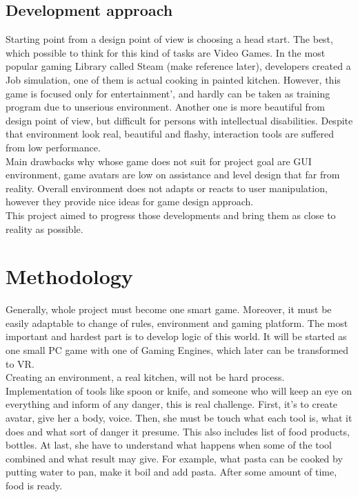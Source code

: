 \documentclass[18pt]{article}
\numberwithin{equation}{section} %
\numberwithin{figure}{section} %
\numberwithin{table}{section} %
\begin{document}
	\subsection{Development approach}
		Starting point from a design point of view is choosing a head start. The best, which possible to think for this kind of tasks are Video Games. In the most popular gaming Library called Steam (make reference later), developers created a Job simulation, one of them is actual cooking in painted kitchen. However, this game is focused only for entertainment', and hardly can be taken as training program due to unserious environment. Another one is more beautiful from design point of view, but difficult for persons with intellectual disabilities. Despite that environment look real, beautiful and flashy, interaction tools are suffered from low performance. \\
		Main drawbacks why whose game does not suit for project goal are GUI environment, game avatars are low on assistance and level design that far from reality. Overall environment does not adapts or reacts to user manipulation, however they provide nice ideas for game design approach. \\
		This project aimed to progress those developments and bring them as close to reality as possible. \\
	
\section{Methodology}	
	Generally, whole project must become one smart game. Moreover, it must be easily adaptable to change of rules, environment and gaming platform. The most important and hardest part is to develop logic of this world. It will be started as one small PC game with one of Gaming Engines, which later can be transformed to VR. \\
	
	Creating an environment, a real kitchen, will not be hard process. Implementation of tools like spoon or knife, and someone who will keep an eye on everything and inform of any danger, this is real challenge. First, it's to create avatar, give her a body, voice. Then, she must be touch what each tool is, what it does and what sort of danger it presume. This also includes list of food products, bottles. At last, she have to understand what happens when some of the tool combined and what result may give. For example, what pasta can be cooked by putting water to pan, make it boil and add pasta. After some amount of time, food is ready. \\
	
\end{document}
